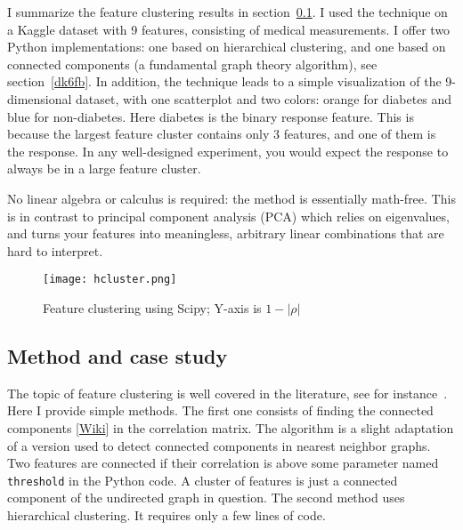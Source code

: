 \documentclass[oneside,10pt]{book}
\begin{document}
 I summarize the feature clustering results in section~\ref{ioude}.
 I used the technique on a Kaggle dataset with 9 features, consisting of medical measurements. I offer two Python
 implementations: one based on hierarchical clustering, and one based on connected components (a
 fundamental graph theory
 algorithm), see section~\ref{dk6fb}. In addition, the
 technique leads to a simple visualization of the 9-dimensional dataset, with one scatterplot and two colors: orange for diabetes
 and blue for non-diabetes. Here diabetes is the binary response feature.
This is because the largest feature cluster  contains only 3
 features, and one of them is the response. In any well-designed experiment, you would expect the response to always be in
 a large feature cluster.

No linear algebra or calculus is required: the method is essentially math-free. This is in contrast to principal component analysis (PCA) which
 relies on eigenvalues, and turns your features into meaningless, arbitrary linear combinations that are hard to interpret.

\begin{figure}[H]
\centering
\texttt{[image: hcluster.png]}
\caption{Feature clustering using Scipy; Y-axis is $1-|\rho|$}
\label{fig:picbhggg2xspp}
\end{figure}

\subsection{Method and case study}\label{ioude}


The topic of \textcolor{index}{feature clustering} is well covered in the literature, see for instance~\cite{fcnice}.  Here I provide simple methods. The first one  consists of finding the \textcolor{index}{connected components}
 [\href{https://en.wikipedia.org/wiki/Component_(graph_theory)}{Wiki}] in the correlation matrix. The algorithm is a slight adaptation of a version used to detect
 connected components in nearest neighbor graphs.
 Two features are connected if their correlation is above some parameter named \texttt{threshold} in the Python code.  A cluster of features is just a connected component of the
 \textcolor{index}{undirected graph} in question. The second method uses
\textcolor{index}{hierarchical clustering}. It requires only a few lines of code.
\end{document}
